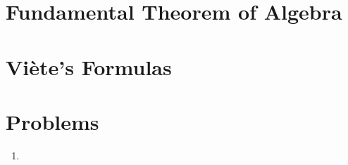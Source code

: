 \documentclass{article}
\begin{document}
\section{Fundamental Theorem of Algebra}




\section{Viète's Formulas}




\section{Problems}

\begin{enumerate}

\item 

\end{enumerate}
\end{document}
